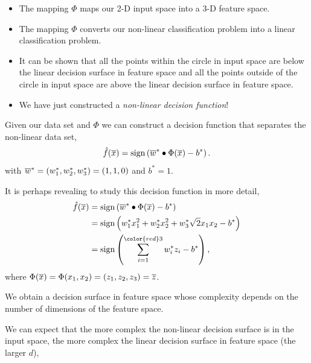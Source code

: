 \documentclass[a4paper,blends,pdf,colorBG,slideColor]{prosper}
\begin{document}
\begin{itemize}
\item The mapping $\Phi$ maps our 2-D input space into a 3-D feature space.
\item The mapping $\Phi$ converts our non-linear classification problem into a linear classification 
problem.
\item It can be shown that all the points within the circle in input space are below the linear
decision surface in feature space and all the points outside of the circle in input space
are above the linear decision surface in feature space.

\item We have just constructed a {\em non-linear decision function}!
\end{itemize}
\es

Given our data set and $\Phi$ we can construct a decision function
that separates the non-linear data set,
\begin{equation*}
\model{f}(\ol{x}) = \sign\left ( \ol{w}^*\bullet\Phi(\ol{x}) - b^* \right).
\end{equation*}
with $\overline{w}^*=  (w^*_1, w^*_2, w^*_3) = (1,1,0)$ and $b^* = 1$. 

It is perhaps revealing to study this decision function in more detail,
\begin{equation*}
\begin{aligned}
\model{f}(\ol{x}) 
	& =  \sign\left (\ol{w}^*\bullet\Phi(\ol{x}) - b^*\right )\\
	& =  \sign\left (w^*_1 x_1^2 + w^*_2 x_2^2 + w^*_3 \sqrt{2} x_1 x_2 - b^*\right )\\
	& =  \sign\left (\sum_{i=1}^{\color{red}3} w^*_i z_i - b^*\right ),
\end{aligned}
\end{equation*}
where $\Phi(\overline{x}) = \Phi(x_1,x_2) = (z_1,z_2,z_3) = \overline{z}$.

We obtain a decision surface in feature space whose complexity depends
on the number of dimensions of the feature space.

\es

\small
We can expect that the more complex the non-linear decision surface is in the input space, the more
complex the linear decision surface in feature space (the larger $d$),
\end{document}
